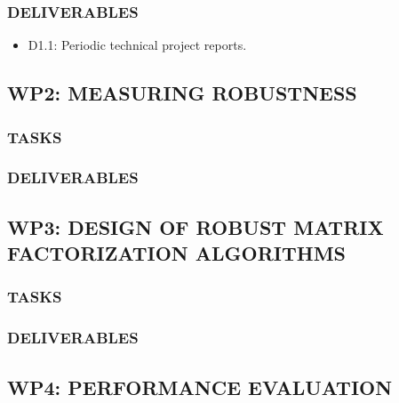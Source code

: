 \documentclass[letterpaper,12pt]{article}
\begin{document}
\subsubsection*{DELIVERABLES}
\begin{itemize}
\item D1.1: Periodic technical project reports.
\end{itemize}

\subsection*{WP2: MEASURING ROBUSTNESS}


\subsubsection*{TASKS }
\begin{itemize}
\end{itemize}

\subsubsection*{DELIVERABLES }
\begin{itemize}
\end{itemize}

\subsection*{WP3: DESIGN OF ROBUST MATRIX FACTORIZATION ALGORITHMS}

\subsubsection*{TASKS }
\begin{itemize}
\end{itemize}

\subsubsection*{DELIVERABLES }
\begin{itemize}
\end{itemize}

\subsection*{WP4: PERFORMANCE EVALUATION}
\end{document}

